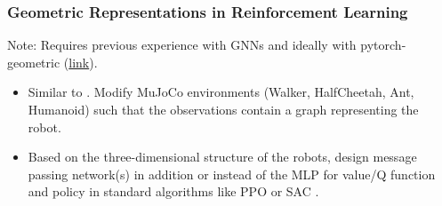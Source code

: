 \documentclass[a4paper]{article}
\begin{document}

\subsubsection{Geometric Representations in Reinforcement Learning}
Note: Requires previous experience with GNNs \cite{Kipf2017semisupervised} and ideally with pytorch-geometric (\href{https://github.com/pyg-team/pytorch_geometric}{link}).
\begin{itemize}
  \item Similar to \citet{Wang2018nervenet}. Modify MuJoCo environments (Walker, HalfCheetah, Ant, Humanoid) such that the observations contain a graph representing the robot.
  \item Based on the three-dimensional structure of the robots, design message passing network(s) in addition or instead of the MLP for value/Q function and policy in standard algorithms like PPO \citet{Schulman2017} or SAC \citet{Haarnoja2018a}.
\end{itemize}

\end{document}
